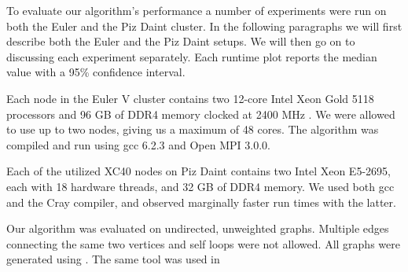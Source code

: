To evaluate our algorithm's performance a number of experiments were run on both the Euler and the
Piz Daint cluster. In the following paragraphs we will first describe both the Euler and the Piz
Daint setups. We will then go on to discussing each experiment separately.
Each runtime plot reports the median value with a 95\% confidence interval.

Each node in the Euler V cluster contains two 12-core Intel Xeon Gold 5118 processors and 96 GB of
DDR4 memory clocked at 2400 MHz \cite{Euler}. We were allowed to use up to two nodes, giving us a
maximum of 48 cores. The algorithm was compiled and run using gcc 6.2.3 and Open MPI 3.0.0.

Each of the utilized XC40 nodes on Piz Daint contains two Intel Xeon E5-2695, each with 18 hardware
threads,
and 32 GB of DDR4 memory. We used both gcc and the Cray compiler, and observed marginally faster
run times with the latter.

Our algorithm was evaluated on undirected, unweighted graphs. Multiple edges connecting the same
two vertices and self loops were not allowed. All graphs were generated using \cite{Parmat}. The same tool was used in \cite{comm_avoiding}


